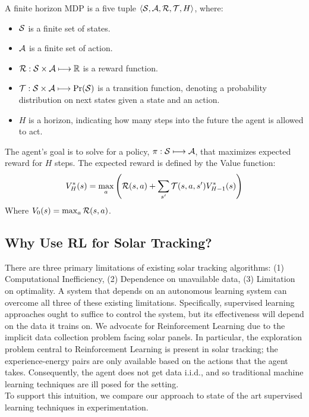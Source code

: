 \documentclass[11pt]{article}
\begin{document}
A finite horizon MDP is a five tuple $\langle \mathcal{S}, \mathcal{A}, \mathcal{R}, \mathcal{T}, H \rangle$, where:
\begin{itemize}
\item $\mathcal{S}$ is a finite set of states.
\item $\mathcal{A}$ is a finite set of action.
\item $\mathcal{R} : \mathcal{S} \times \mathcal{A} \longmapsto \mathbb{R}$ is a reward function.
\item $\mathcal{T} : \mathcal{S} \times \mathcal{A} \longmapsto \Pr(\mathcal{S})$ is a transition function, denoting a probability distribution on next states given a state and an action.
\item $H$ is a horizon, indicating how many steps into the future the agent is allowed to act.
\end{itemize}

The agent's goal is to solve for a policy, $\pi : \mathcal{S} \longmapsto \mathcal{A}$, that maximizes expected reward for $H$ steps. The expected reward is defined by the Value function:
\begin{equation}
V_H^*(s) = \max_a \left( \mathcal{R}(s,a) + \sum_{s'} \mathcal{T}(s,a,s') V_{H-1}^*(s)\right)
\end{equation}
Where $V_0(s) = \max_a \mathcal{R}(s,a)$. \\


\subsection{Why Use RL for Solar Tracking?}

There are three primary limitations of existing solar tracking algorithms: (1) Computational Inefficiency, (2) Dependence on unavailable data, (3) Limitation on optimality. A system that depends on an autonomous learning system can overcome all three of these existing limitations. Specifically, supervised learning approaches ought to suffice to control the system, but its effectiveness will depend on the data it trains on. We advocate for Reinforcement Learning due to the implicit data collection problem facing solar panels. In particular, the exploration problem central to Reinforcement Learning is present in solar tracking; the experience-energy pairs are only available based on the actions that the agent takes. Consequently, the agent does not get data i.i.d., and so traditional machine learning techniques are ill posed for the setting. \\

To support this intuition, we compare our approach to state of the art supervised learning techniques in experimentation. \\
\end{document}
